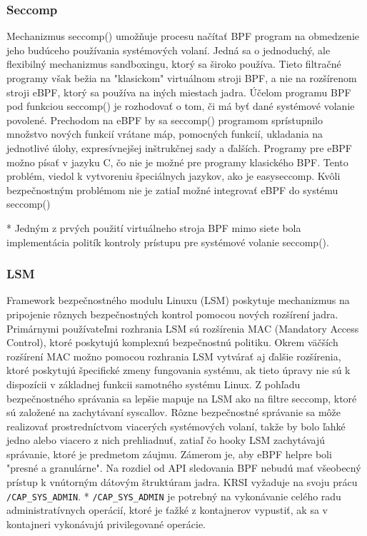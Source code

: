 \subsubsection{Seccomp}
Mechanizmus seccomp() umožňuje procesu načítať BPF program na obmedzenie jeho budúceho používania systémových volaní.
Jedná sa o jednoduchý, ale flexibilný mechanizmus sandboxingu, ktorý sa široko používa. 
Tieto filtračné programy však bežia na "klasickom" virtuálnom stroji BPF, a nie na rozšírenom stroji eBPF, ktorý sa používa na iných miestach jadra. 
Účelom programu BPF pod funkciou seccomp() je rozhodovať o tom, či má byť dané systémové volanie povolené.
Prechodom na eBPF by sa seccomp() programom sprístupnilo množstvo nových funkcií vrátane máp, pomocných funkcií, ukladania na jednotlivé úlohy, 
expresívnejšej inštrukčnej sady a ďalších. 
Programy pre eBPF možno písať v jazyku C, čo nie je možné pre programy klasického BPF. 
Tento problém, viedol k vytvoreniu špeciálnych jazykov, ako je easyseccomp. 
Kvôli bezpečnostným problémom nie je zatiaľ možné integrovať eBPF do systému seccomp()

* Jedným z prvých použití virtuálneho stroja BPF mimo siete bola implementácia politík kontroly prístupu pre systémové volanie seccomp().

\subsubsection{LSM}
Framework bezpečnostného modulu Linuxu (LSM) poskytuje mechanizmus na pripojenie rôznych bezpečnostných kontrol pomocou nových rozšírení jadra. 
Primárnymi používateľmi rozhrania LSM sú rozšírenia MAC (Mandatory Access Control), ktoré poskytujú komplexnú bezpečnostnú politiku. 
Okrem väčších rozšírení MAC možno pomocou rozhrania LSM vytvárať aj ďalšie rozšírenia, ktoré poskytujú špecifické zmeny fungovania systému, 
ak tieto úpravy nie sú k dispozícii v základnej funkcii samotného systému Linux. Z pohľadu bezpečnostného správania sa lepšie mapuje na LSM ako na 
filtre seccomp, ktoré sú založené na zachytávaní syscallov. Rôzne bezpečnostné správanie sa môže realizovať prostredníctvom viacerých systémových volaní, 
takže by bolo ľahké jedno alebo viacero z nich prehliadnuť, zatiaľ čo hooky LSM zachytávajú správanie, ktoré je predmetom záujmu. 
Zámerom je, aby eBPF helpre boli "presné a granulárne". Na rozdiel od API sledovania BPF nebudú mať všeobecný prístup k vnútorným dátovým štruktúram jadra. 
KRSI vyžaduje na svoju prácu \texttt{/CAP\_SYS\_ADMIN}.
* \texttt{/CAP\_SYS\_ADMIN} je potrebný na vykonávanie celého radu administratívnych operácií, ktoré je ťažké z kontajnerov vypustiť, 
ak sa v kontajneri vykonávajú privilegované operácie.

